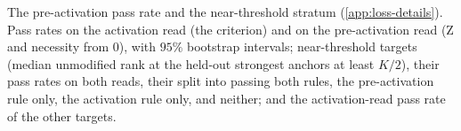 
\begin{table}[tbp]
\centering
\scriptsize
\caption{The pre-activation pass rate and the near-threshold stratum (\cref{app:loss-details}).
Pass rates on the activation read (the criterion) and on the pre-activation read (Z and necessity from $0$), with $95\%$ bootstrap intervals; near-threshold targets (median unmodified rank at the held-out strongest anchors at least $K/2$), their pass rates on both reads, their split into passing both rules, the pre-activation rule only, the activation rule only, and neither; and the activation-read pass rate of the other targets.}
\label{tab:run2026-near-threshold}
\end{table}
